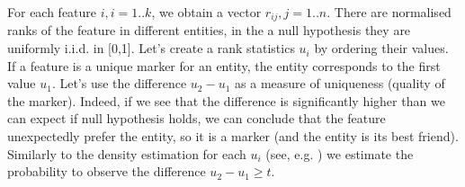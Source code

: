 \documentclass[12pt]{article}
\begin{document}
For each feature $i,i=1..k$, we obtain a vector $r_{ij}, j=1..n$. There are normalised ranks of the feature in different entities, in the a null hypothesis they are uniformly i.i.d. in [0,1]. Let's create a rank statistics $u_i$ by ordering their values. If a feature is a unique marker for an entity, the entity corresponds to the first  value $u_1$. Let's use the difference $u_2-u_1$ as a measure of uniqueness (quality of the marker). Indeed, if we see that the difference is significantly higher than we can expect if null hypothesis holds, we can conclude that the feature unexpectedly prefer the entity, so it is a marker (and the entity is its best friend). Similarly to the density estimation for each $u_i$ (see, e.g. \cite{Gut:2009}) we estimate the probability to observe the difference $u_2 - u_1 \ge t$. 
\end{document}
